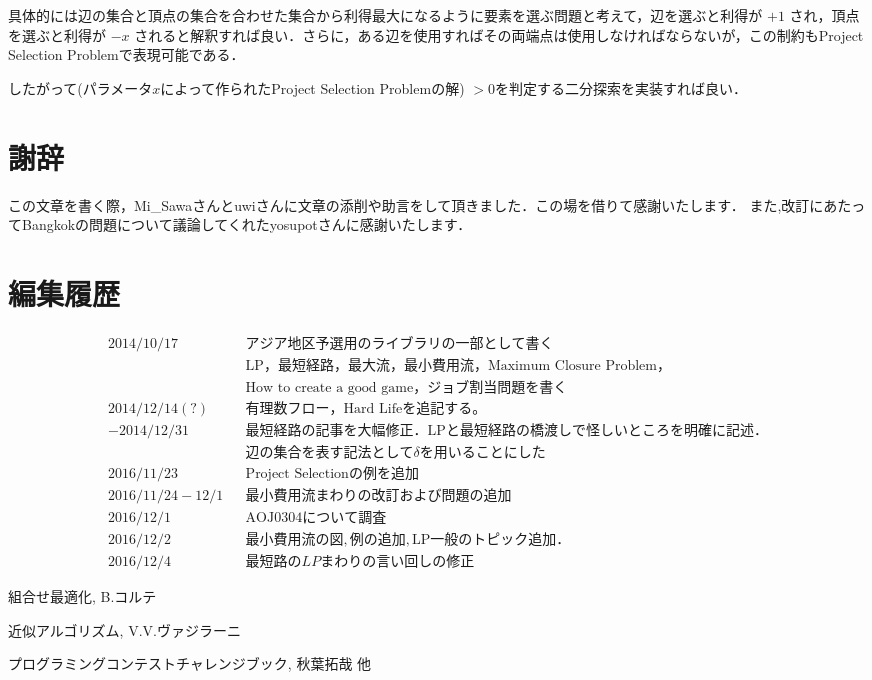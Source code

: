\documentclass[13pt]{jarticle}
\theoremstyle{nonitalic} %
\begin{document}
具体的には辺の集合と頂点の集合を合わせた集合から利得最大になるように要素を選ぶ問題と考えて，辺を選ぶと利得が $+1$ され，頂点を選ぶと利得が $-x$ されると解釈すれば良い．さらに，ある辺を使用すればその両端点は使用しなければならないが，この制約もProject Selection Problemで表現可能である． 

したがって(パラメータ$x$によって作られたProject Selection Problemの解) $>0$を判定する二分探索を実装すれば良い． 





\section*{謝辞}
この文章を書く際，Mi\_Sawaさんとuwiさんに文章の添削や助言をして頂きました．この場を借りて感謝いたします．
また,改訂にあたってBangkokの問題について議論してくれたyosupotさんに感謝いたします．

\section*{編集履歴}
\begin{align*}
  &&& 2014/10/17 && アジア地区予選用のライブラリの一部として書く &&&\\
  &&&            && \mathrm{LP}， 最短経路， 最大流， 最小費用流， \textrm{Maximum Closure Problem}， \\
  &&&            &&\textrm{How to create a good game}， ジョブ割当問題を書く \\
  &&& 2014/12/14(?) && 有理数フロー， \textrm{Hard Life}を追記する。 \\
  &&& -2014/12/31    && 最短経路の記事を大幅修正．\textrm{LP}と最短経路の橋渡しで怪しいところを明確に記述．\\
  &&&               && 辺の集合を表す記法として \delta を用いることにした\\
  &&& 2016/11/23 && \textrm{Project Selection}の例を追加　\\
  &&& 2016/11/24-12/1 && 最小費用流まわりの改訂および問題の追加 \\
  &&& 2016/12/1 && \textrm{AOJ0304}について調査 \\
  &&& 2016/12/2 && 最小費用流の図,例の追加, \textrm{LP}一般のトピック追加． \\
  &&& 2016/12/4 && 最短路のLPまわりの言い回しの修正 
\end{align*}

\begin{thebibliography}{99}
 組合せ最適化, B.コルテ

 近似アルゴリズム, V.V.ヴァジラーニ

 プログラミングコンテストチャレンジブック, 秋葉拓哉 他

\end{thebibliography}
\end{document}
